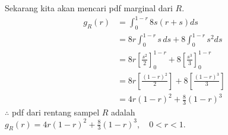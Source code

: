 \documentclass{exam}
\begin{document}
\begin{enumerate}
\begin{enumerate}
\begin{solution}
                Sekarang kita akan mencari pdf marginal dari $R$.
                \begin{align*}
                    g_R(r) &= \int_{0}^{1-r}8s(r+s)ds\\
                    &= 8r\int_{0}^{1-r}s\,ds+8\int_{0}^{1-r}s^2ds\\
                    &= 8r\left[\frac{s^2}{2}\right]_{0}^{1-r}+8\left[\frac{s^3}{3}\right]_{0}^{1-r}\\
                    &= 8r\left[\frac{(1-r)^2}{2}\right]+8\left[\frac{(1-r)^3}{3}\right]\\
                    &= 4r(1-r)^2+\frac{8}{3}(1-r)^3
                \end{align*}
                $\therefore$ pdf dari rentang sampel $R$ adalah $\displaystyle g_R(r)=4r(1-r)^2+\frac{8}{3}(1-r)^3, \quad 0<r<1$.
            \end{solution}
        \end{enumerate}


\end{enumerate}
\end{document}
